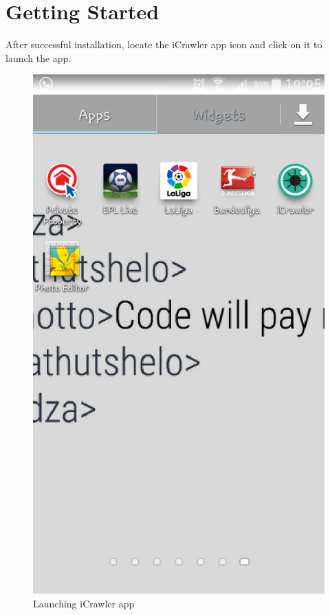 \documentclass[hidelinks, 12pt, oneside]{article}
\begin{document}
	\section{Getting Started}
	After successful installation, locate the iCrawler app icon and click on it to launch the app.
	 \begin{figure}[h!]
	 	 \caption{Launching iCrawler app}
	 	 \centering 																																	\includegraphics[width=0.5 \textwidth]{img/newImgs/appLaunch.png}
	 \end{figure}\newpage
	 
\end{document}
